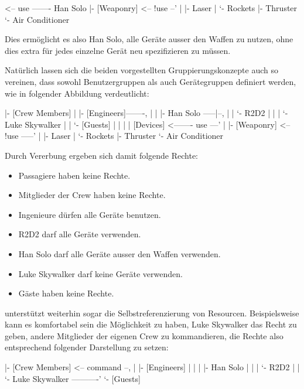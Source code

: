 \begin{indentverb}
[Devices] <-- use ------- Han Solo
  |- [Weaponry] <-- !use --'
  |   |- Laser
  |   `- Rockets
  |- Thruster
  `- Air Conditioner
\end{indentverb}
 
Dies ermöglicht es also Han Solo, alle Geräte ausser den Waffen zu nutzen, 
ohne dies extra für jedes einzelne Gerät neu spezifizieren zu müssen.

Natürlich lassen sich die beiden vorgestellten Gruppierungskonzepte auch 
so vereinen, dass sowohl Benutzergruppen als auch Gerätegruppen definiert 
werden, wie in folgender Abbildung verdeutlicht:

\begin{indentverb}
[Passengers]
  |- [Crew Members]
  |   |- [Engineers]-------,
  |   |   |- Han Solo -----|--,
  |   |   `- R2D2          |  |
  |   `- Luke Skywalker    |  |
  `- [Guests]              |  |
                           |  |
[Devices]  <------- use ---'  |
  |- [Weaponry] <-- !use -----'
  |   |- Laser
  |   `- Rockets
  |- Thruster
  `- Air Conditioner
\end{indentverb}

Durch Vererbung ergeben sich damit folgende Rechte:

\begin{itemize}
\item Passagiere haben keine Rechte.
\item Mitglieder der Crew haben keine Rechte.
\item Ingenieure dürfen alle Geräte benutzen.
\item R2D2 darf alle Geräte verwenden.
\item Han Solo darf alle Geräte ausser den Waffen verwenden.
\item Luke Skywalker darf keine Geräte verwenden.
\item Gäste haben keine Rechte.
\end{itemize}

\product unterstützt weiterhin sogar die Selbstreferenzierung von 
Resourcen. Beispielsweise kann es komfortabel sein die Möglichkeit zu 
haben, Luke Skywalker das Recht zu geben, andere Mitglieder der eigenen Crew 
zu kommandieren, die Rechte also entsprechend folgender Darstellung zu setzen:

\begin{indentverb}
[Passengers]
  |- [Crew Members] <-- command --,
  |   |- [Engineers]              |
  |   |   |- Han Solo             |
  |   |   `- R2D2                 |
  |   `- Luke Skywalker ----------'
  `- [Guests]
\end{indentverb}

